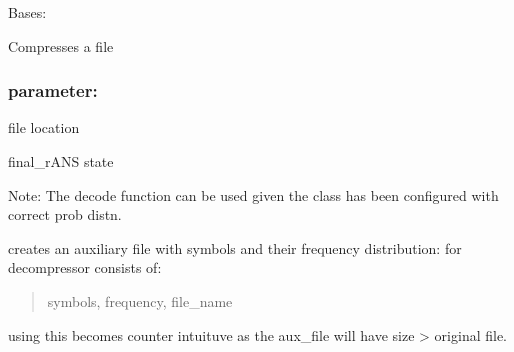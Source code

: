 \documentclass[letterpaper,10pt,english]{sphinxmanual}
\begin{document}
\begin{fulllineitems}
\label{\detokenize{file_compressor:file_compressor.FileCompressor}}
\pysigstartsignatures
{}
\pysigstopsignatures
\sphinxAtStartPar
Bases: 

\sphinxAtStartPar
Compresses a file


\subsubsection{parameter:}
\label{\detokenize{file_compressor:parameter}}\begin{description}
\sphinxAtStartPar
file location

\sphinxAtStartPar
final\_rANS state

\end{description}

\sphinxAtStartPar
Note: The decode function can be used given the class has been configured with correct prob distn.

\begin{fulllineitems}
\label{\detokenize{file_compressor:file_compressor.FileCompressor.create_aux_file}}
\pysigstartsignatures
{}
\pysigstopsignatures
\sphinxAtStartPar
creates an auxiliary file with symbols and their frequency distribution: for decompressor
consists of:
\begin{quote}

\sphinxAtStartPar
symbols, frequency, file\_name
\end{quote}

\sphinxAtStartPar
using this becomes counter intuituve as the aux\_file will have size \textgreater{} original file.

\end{fulllineitems}


\begin{fulllineitems}
\label{\detokenize{file_compressor:file_compressor.FileCompressor.decode}}
\pysigstartsignatures
{}
\pysigstopsignatures
\end{fulllineitems}


\end{fulllineitems}
\end{document}
